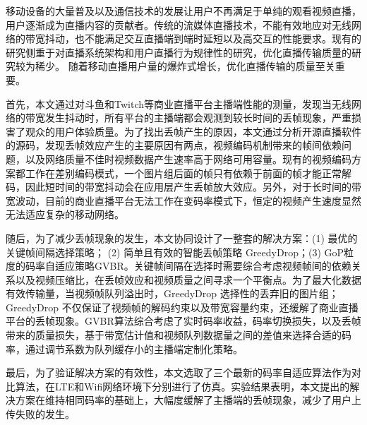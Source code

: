 \begin{cabstract}
移动设备的大量普及以及通信技术的发展让用户不再满足于单纯的观看视频直播，用户逐渐成为直播内容的贡献者。传统的流媒体直播技术，不能有效地应对无线网络的带宽抖动，也不能满足交互直播端到端时延短以及高交互的性能要求。现有的研究侧重于对直播系统架构和用户直播行为规律性的研究，优化直播传输质量的研究较为稀少。%
随着移动直播用户量的爆炸式增长，优化直播传输的质量至关重要。

首先，本文通过对斗鱼和Twitch等商业直播平台主播端性能的测量，发现当无线网络的带宽发生抖动时，所有平台的主播端都会观测到较长时间的丢帧现象，严重损害了观众的用户体验质量。为了找出丢帧产生的原因，本文通过分析开源直播软件的源码，发现丢帧效应产生的主要原因有两点，视频编码机制带来的帧间依赖问题，以及网络质量不佳时视频数据产生速率高于网络可用容量。现有的视频编码方案都工作在差别编码模式，一个图片组后面的帧只有依赖于前面的帧才能正常解码，因此短时间的带宽抖动会在应用层产生丢帧放大效应。另外，对于长时间的带宽波动，目前的商业直播平台无法工作在变码率模式下，恒定的视频产生速度显然无法适应复杂的移动网络。

随后，为了减少丢帧现象的发生，本文协同设计了一整套的解决方案：(1) 最优的关键帧间隔选择策略； (2) 简单且有效的智能丢帧策略 GreedyDrop；(3) GoP粒度的码率自适应策略GVBR。关键帧间隔在选择时需要综合考虑视频帧间的依赖关系以及视频压缩比，在丢帧效应和视频质量之间寻求一个平衡点。为了最大化数据有效传输量，当视频帧队列溢出时，GreedyDrop 选择性的丢弃旧的图片组；GreedyDrop 不仅保证了视频帧的解码约束以及带宽容量约束，还缓解了商业直播平台的丢帧现象。GVBR算法综合考虑了实时码率收益，码率切换损失，以及丢帧带来的质量损失，基于带宽估计值和视频队列数据量之间的差值来选择合适的码率，通过调节系数为队列缓存小的主播端定制化策略。

最后，为了验证解决方案的有效性，本文选取了三个最新的码率自适应算法作为对比算法，在LTE和Wifi网络环境下分别进行了仿真。实验结果表明，本文提出的解决方案在维持相同码率的基础上，大幅度缓解了主播端的丢帧现象，减少了用户上传失败的发生。
\end{cabstract}


